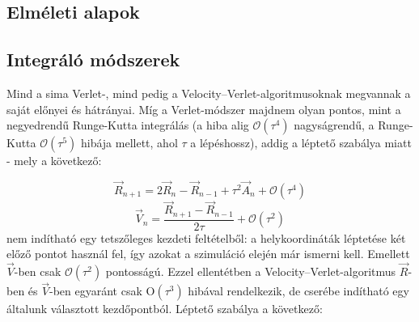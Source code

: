 \begin{multicols}{2}
\section{Elméleti alapok} \label{sec:3}
\subsection{Integráló módszerek} \label{sub:3.1}
Mind a sima Verlet-, mind pedig a Velocity--Verlet-algoritmusoknak megvannak a saját előnyei és hátrányai. Míg a Verlet-módszer majdnem olyan pontos, mint a negyedrendű Runge-Kutta integrálás (a hiba alig $\mathscr{O} \left( \tau^{4} \right)$ nagyságrendű, a Runge-Kutta $\mathscr{O} \left( \tau^{5} \right)$ hibája mellett, ahol $\tau$ a lépéshossz), addig a léptető szabálya miatt - mely a következő:

\begin{equation}
    \vec{R}_{n + 1}
    =
    2 \vec{R}_{n} - \vec{R}_{n - 1} + \tau^{2} \vec{A}_{n} + \mathscr{O} \left( \tau^{4} \right)
\end{equation}
\begin{equation}
    \vec{V}_{n}
    =
    \frac{\vec{R}_{n + 1} - \vec{R}_{n - 1}}{2 \tau} + \mathscr{O} \left( \tau^{2} \right)
\end{equation}
nem indítható egy tetszőleges kezdeti feltételből: a helykoordináták léptetése két előző pontot használ fel, így azokat a szimuláció elején már ismerni kell. Emellett $\vec{V}$-ben csak $\mathscr{O} \left( \tau^{2} \right)$ pontosságú. Ezzel ellentétben a Velocity--Verlet-algoritmus $\vec{R}$-ben és $\vec{V}$-ben egyaránt csak $\mathrm{O}\left( \tau^{3} \right)$ hibával rendelkezik, de cserébe indítható egy általunk választott kezdőpontból. Léptető szabálya a következő:


\end{multicols}
